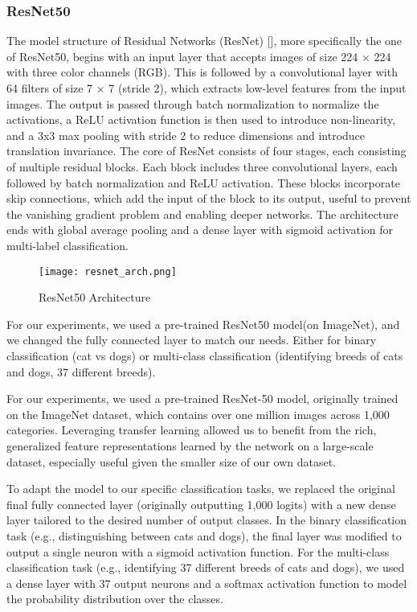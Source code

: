 \documentclass{article}
\begin{document}
\subsubsection{ResNet50}
The model structure of Residual Networks (ResNet)  [\cite{he2015deepresiduallearningimage}], more specifically the one of ResNet50, begins with an input layer that accepts images of size 224 × 224 with three color channels (RGB). This is followed by a convolutional layer with 64 filters of size 7 × 7 (stride 2),  which extracts low-level features from the input images. The output is passed through batch normalization to normalize the activations, a ReLU activation function is then used to introduce non-linearity, and a 3x3 max pooling with stride 2 to reduce dimensions and introduce translation invariance. The core of ResNet consists of four stages, each consisting of multiple residual blocks. Each block includes three convolutional layers, each followed by batch normalization and ReLU activation. These blocks incorporate skip connections, which add the input of the block to its output, useful to prevent the vanishing gradient problem and enabling deeper networks. The architecture ends with global average pooling and a dense layer with sigmoid activation for multi-label classification.

\begin{figure}[h]
    \centering
    \texttt{[image: resnet\_arch.png]}
    \caption{ResNet50 Architecture}
    \label{fig:resnet_architecture}
\end{figure}

For our experiments, we used a pre-trained ResNet50 model(on ImageNet), and we changed the fully connected layer to match our needs. Either for binary classification (cat vs dogs) or multi-class classification (identifying breeds of cats and dogs, 37 different breeds).

For our experiments, we used a pre-trained ResNet-50 model, originally trained on the ImageNet dataset, which contains over one million images across 1,000 categories. Leveraging transfer learning allowed us to benefit from the rich, generalized feature representations learned by the network on a large-scale dataset, especially useful given the smaller size of our own dataset.

To adapt the model to our specific classification tasks, we replaced the original final fully connected layer (originally outputting 1,000 logits) with a new dense layer tailored to the desired number of output classes. In the binary classification task (e.g., distinguishing between cats and dogs), the final layer was modified to output a single neuron with a sigmoid activation function. For the multi-class classification task (e.g., identifying 37 different breeds of cats and dogs), we used a dense layer with 37 output neurons and a softmax activation function to model the probability distribution over the classes.
\end{document}

